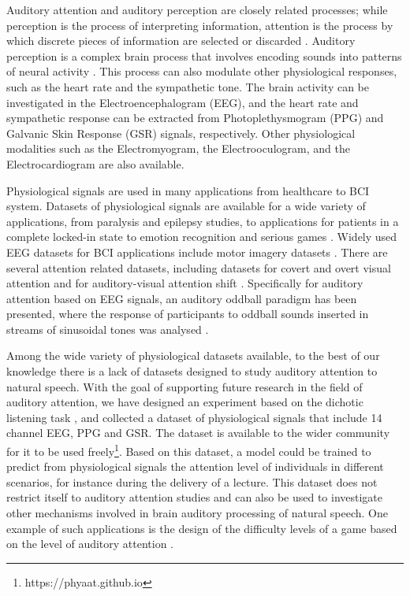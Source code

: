 \documentclass{article}
\begin{document}
Auditory attention and auditory perception are closely related processes; while perception is the process of interpreting information, attention is the process by which discrete pieces of information are selected or discarded \cite{styles2004attention}. Auditory perception is a complex brain process that involves encoding sounds into patterns of neural activity \cite{theunissen2004methods}. This process can also modulate other physiological responses, such as the heart rate and the sympathetic tone. The brain activity can be investigated in the Electroencephalogram (EEG), and the heart rate and sympathetic response can be extracted from Photoplethysmogram (PPG) and Galvanic Skin Response (GSR) signals, respectively. Other physiological modalities such as the Electromyogram, the Electrooculogram, and the Electrocardiogram are also available. 

Physiological signals are used in many applications from healthcare to BCI system. Datasets of physiological signals are available for a wide variety of applications, from paralysis \cite{BCIPararylysis2008} and epilepsy \cite{andrzejak2012nonrandomness} studies, to applications for patients in a complete locked-in state \cite{BCISpeller2011, BCIAud2012, BCILockedin2011} to emotion recognition \cite{EmoReco2004, EmoPhys2005, EmoEEG2006, koelstra2012deap, EEGMusic2010} and serious games \cite{EmoGame2011, EEGgame2010, EEGgame2011}. Widely used EEG datasets for BCI applications include motor imagery datasets \cite{brunner2008bci, leeb2007brain, shin2017open}. There are several attention related datasets, including datasets for covert and overt visual attention \cite{aloise2012covert, arico2014influence, treder2011brain} and for auditory-visual attention shift \cite{vceponiene2008modality}. Specifically for auditory attention based on EEG signals, an auditory oddball paradigm has been presented, where the response of participants to oddball sounds inserted in streams of sinusoidal tones was analysed \cite{halder2010auditory, schreuder2010new}.

Among the wide variety of physiological datasets available, to the best of our knowledge there is a lack of datasets designed to study auditory attention to natural speech. With the goal of supporting future research in the field of auditory attention, we have designed an experiment based on the dichotic listening task \cite{dichoticTask2008}, and collected a dataset of physiological signals that include 14 channel EEG, PPG and GSR. The dataset is available to the wider community for it to be used freely\footnote{https://phyaat.github.io}. Based on this dataset, a model could be trained to predict from physiological signals the attention level of individuals in different scenarios, for instance during the delivery of a lecture. This dataset does not restrict itself to auditory attention studies and can also be used to investigate other mechanisms involved in brain auditory processing of natural speech. One example of such applications is the design of the difficulty levels of a game based on the level of auditory attention \cite{bajaj2018auditory}. 
\end{document}
